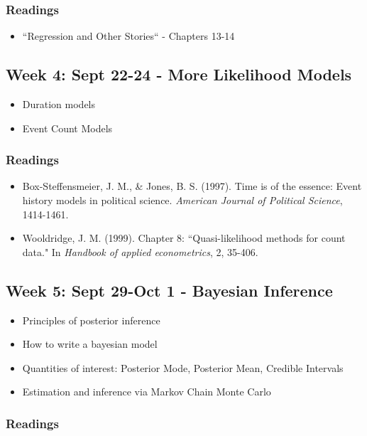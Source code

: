 \documentclass[11pt, article, oneside]{memoir}
\theoremstyle{Assumption}
\begin{document}
\subsubsection*{Readings}

\begin{itemize}
\item ``Regression and Other Stories`` - Chapters 13-14
\end{itemize}

\subsection{Week 4: Sept 22-24 - More Likelihood Models}

\begin{itemize}
\item Duration models
\item Event Count Models
\end{itemize}

\subsubsection*{Readings}

\begin{itemize}
\item Box-Steffensmeier, J. M., \& Jones, B. S. (1997). Time is of the essence: Event history models in political science. \textit{American Journal of Political Science}, 1414-1461.
\item Wooldridge, J. M. (1999). Chapter 8: ``Quasi-likelihood methods for count data." In \textit{Handbook of applied econometrics}, 2, 35-406.
\end{itemize}


\subsection{Week 5: Sept 29-Oct 1 - Bayesian Inference}

\begin{itemize}
\item Principles of posterior inference
\item How to write a bayesian model
\item Quantities of interest: Posterior Mode, Posterior Mean, Credible Intervals
\item Estimation and inference via Markov Chain Monte Carlo
\end{itemize}

\subsubsection*{Readings}
\end{document}
